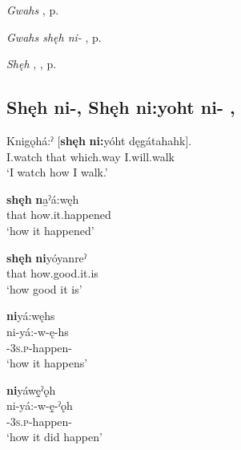 \begin{CayugaRelated}
\item \textit{Gwahs} , p. \pageref{p:[gwahs] ‘anyway’}\\
\item \textit{Gwahs shęh ni-} , p. \pageref{p:[gwahs shęh ni-]}\\
\item \textit{Shęh} , , p. \pageref{p:[shęh] `that’}
\end{CayugaRelated}

\subsection*{\textbf{Shęh ni-, Shęh ni:yoht ni-} , } \label{p:[shęh ni-, shęh ni:yoht ni-]}

\ea
\label{ex:spart36}
\gll Knigǫhá:ˀ [\textbf{shęh} \textbf{ni:}yóht dęgátahahk].\\
I.watch that which.way I.will.walk\\
\glt ‘I watch how I walk.’

\z

\ea
\label{ex:spart37}
\gll \textbf{shęh} \textbf{n}a̱ˀá:węh\\
that how.it.happened\\
\glt ‘how it happened’
\z

\ea
\label{ex:spart38}
\gll \textbf{shęh} \textbf{ni}yóyanreˀ\\
that how.good.it.is\\
\glt ‘how good it is’
\z

\ea
\label{ex:spart39}
\glll \textbf{ni}yá:węhs\\
ni-yá:-w-ę-hs\\
\textsc{\partitive-3s.p}-happen-\textsc{\habitual}\\
\glt ‘how it happens’
\z

\ea
\label{ex:spart40}
\glll \textbf{ni}yáwę̱ˀǫh {}\\
ni-yá:-w-ę̱-ˀǫh\\
\textsc{\partitive-3s.p}-happen-{\stative}\\
\glt ‘how it did happen’
\z

